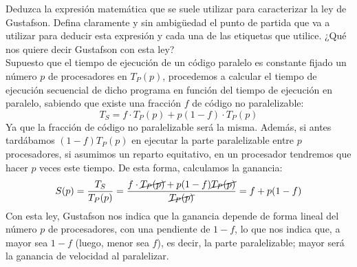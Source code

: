 \begin{cuestion}
    Deduzca la expresión matemática que se suele utilizar para caracterizar la ley de Gustafson. Defina claramente y sin ambigüedad el punto de partida que va a utilizar para deducir esta expresión y cada una de las etiquetas que utilice. ¿Qué nos quiere decir Gustafson con esta ley?\\

    Supuesto que el tiempo de ejecución de un código paralelo es constante fijado un número $p$ de procesadores en $T_P(p)$, procedemos a calcular el tiempo de ejecución secuencial de dicho programa en función del tiempo de ejecución en paralelo, sabiendo que existe una fracción $f$ de código no paralelizable:
    \begin{equation*}
        T_S = f\cdot T_P(p) + p(1-f)\cdot T_P(p)
    \end{equation*}
    Ya que la fracción de código no paralelizable será la misma. Además, si antes tardábamos $(1-f)T_P(p)$ en ejecutar la parte paralelizable entre $p$ procesadores, si asumimos un reparto equitativo, en un procesador tendremos que hacer $p$ veces este tiempo. De esta forma, calculamos la ganancia:
    \begin{equation*}
        S(p) = \dfrac{T_S}{T_P(p)} = \dfrac{f\cdot \cancel{T_P(p)} + p(1-f)\cancel{T_P(p)}}{\cancel{T_P(p)}} = f+p(1-f)
    \end{equation*}
    Con esta ley, Gustafson nos indica que la ganancia depende de forma lineal del número $p$ de procesadores, con una pendiente de $1-f$, lo que nos indica que, a mayor sea $1-f$ (luego, menor sea $f$), es decir, la parte paralelizable; mayor será la ganancia de velocidad al paralelizar.
\end{cuestion}

